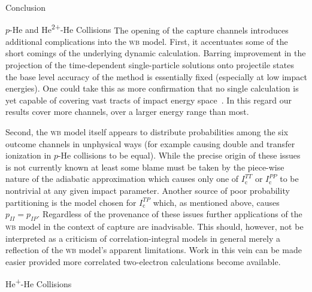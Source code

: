 \documentclass[letterpaper, 11 pt]{report}
\begin{document}
\begin{chapter}{Conclusion \label{chap:con}}
\begin{section}{\texorpdfstring{$p$}{p}-He and \texorpdfstring{He\textsuperscript{2+}}{He2+}-He
                   Collisions \label{sec:con-phe2p-he}}
      The opening of the capture channels introduces additional complications into the \textsc{wb}
      model. First, it accentuates some of the short comings of the underlying dynamic calculation.
      Barring improvement in the projection of the time-dependent single-particle solutions onto
      projectile states the base level accuracy of the method is essentially fixed (especially at low
      impact energies). One could take this as more confirmation that no single calculation is yet
      capable of covering vast tracts of impact energy space~\cite{LRV-14}. In this regard our results
      cover more channels, over a larger energy range than most.
 
      Second, the \textsc{wb} model itself appears to distribute probabilities among the six outcome
      channels in unphysical ways (for example causing double and transfer ionization in $p$-He
      collisions to be equal). While the precise origin of these issues is not currently known at least
      some blame must be taken by the piece-wise nature of the adiabatic approximation which causes only
      one of $I^{TT}_\mathrm{c}$ or $I^{PP}_\mathrm{c}$ to be nontrivial at any given impact parameter.
      Another source of poor probability partitioning is the model chosen for $I^{TP}_\mathrm{c}$ which,
      as mentioned above, causes $p_{II} = p_{IP}$. Regardless of the provenance of these issues further
      applications of the \textsc{wb} model in the context of capture are inadvisable. This should,
      however, not be interpreted as a criticism of correlation-integral models in general merely a
      reflection of the \textsc{wb} model's apparent limitations. Work in this vein can be made easier
      provided more correlated two-electron calculations become available.

   \end{section}

   \begin{section}{\texorpdfstring{He\textsuperscript{+}}{He+}-He Collisions \label{sec:con-hephe}}

   \end{section}

\end{chapter}
\end{document}
